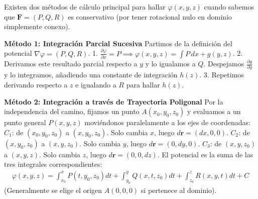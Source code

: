 \documentclass[11pt,a4paper]{article}
\begin{document}
Existen dos métodos de cálculo principal para hallar $\varphi(x,y,z)$ cuando sabemos que $\mathbf{F} = (P, Q, R)$ es conservativo (por tener rotacional nulo en dominio simplemente conexo).

\textbf{Método 1: Integración Parcial Sucesiva}
Partimos de la definición del potencial $\nabla\varphi = (P, Q, R)$.
1. $\frac{\partial \varphi}{\partial x} = P \implies \varphi(x,y,z) = \int P \, dx + g(y,z)$.
2. Derivamos este resultado parcial respecto a $y$ y lo igualamos a $Q$. Despejamos $\frac{\partial g}{\partial y}$ y lo integramos, añadiendo una constante de integración $h(z)$.
3. Repetimos derivando respecto a $z$ e igualando a $R$ para hallar $h(z)$.

\textbf{Método 2: Integración a través de Trayectoria Poligonal}
Por la independencia del camino, fijamos un punto $A(x_0, y_0, z_0)$ y evaluamos a un punto general $P(x,y,z)$ moviéndonos paralelamente a los ejes de coordenadas:
$C_1$: de $(x_0, y_0, z_0)$ a $(x, y_0, z_0)$. Solo cambia $x$, luego $d\mathbf{r} = (dx, 0, 0)$.
$C_2$: de $(x, y_0, z_0)$ a $(x, y, z_0)$. Solo cambia $y$, luego $d\mathbf{r} = (0, dy, 0)$.
$C_3$: de $(x, y, z_0)$ a $(x, y, z)$. Solo cambia $z$, luego $d\mathbf{r} = (0, 0, dz)$.
El potencial es la suma de las tres integrales correspondientes:
\begin{align*}
\varphi(x,y,z) = \int_{x_0}^x P(t, y_0, z_0) dt + \int_{y_0}^y Q(x, t, z_0) dt + \int_{z_0}^z R(x, y, t) dt + C
\end{align*}
(Generalmente se elige el origen $A(0,0,0)$ si pertenece al dominio).
\end{document}
